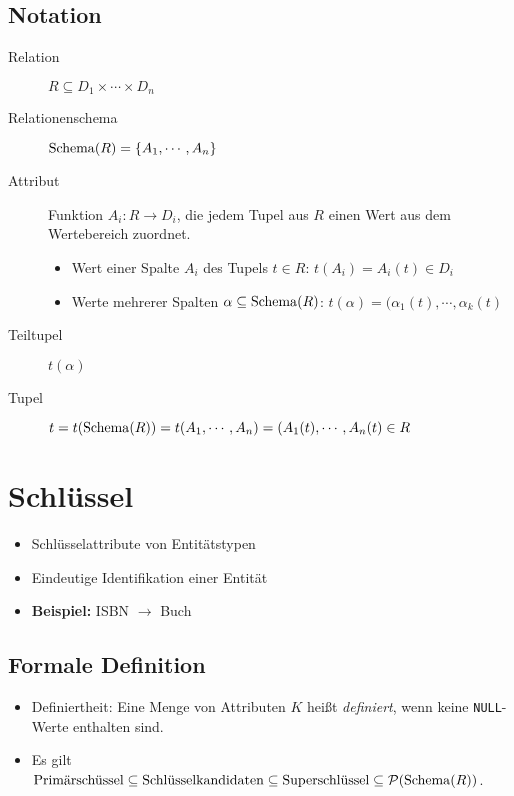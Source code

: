 		\subsection{Notation} %
			\begin{description}
				\item[Relation] \( R \subseteq D _ 1 \times \cdots \times D _ n \)
				\item[Relationenschema] \( \operatorname{Schema}(R) = \{ A _ 1, \cdots, A _ n \} \)
				\item[Attribut] Funktion \( A _ i : R \rightarrow D _ i \), die jedem Tupel aus \(R\) einen Wert aus dem Wertebereich zuordnet.
					\begin{itemize}
						\item Wert einer Spalte \(A_i\) des Tupels \( t \in R \): \( t(A_i) = A_i(t) \in D_i \)
						\item Werte mehrerer Spalten \( \alpha \subseteq \operatorname{Schema}(R) \): \( t(\alpha) = (\alpha_1(t), \cdots, \alpha_k(t) \)
					\end{itemize}
				\item[Teiltupel] \(t(\alpha)\)
				\item[Tupel] \( t = t(\operatorname{Schema}(R)) = t(A_1, \cdots, A_n) = (A_1(t), \cdots, A_n(t) \in R \)
			\end{description}

	\section{Schlüssel} %
		\begin{itemize}
			\item Schlüsselattribute von Entitätstypen
			\item Eindeutige Identifikation einer Entität
			\item \textbf{Beispiel:} ISBN \(\rightarrow\) Buch
		\end{itemize}

		\subsection{Formale Definition} %
			\begin{itemize}
				\item Definiertheit: Eine Menge von Attributen \(K\) heißt \textit{definiert}, wenn keine \lstinline|NULL|-Werte enthalten sind.
				\item Es gilt \( \text{Primärschüssel} \subseteq \text{Schlüsselkandidaten} \subseteq \text{Superschlüssel} \subseteq \mathcal{P}(\operatorname{Schema}(R)) \).
			\end{itemize}

